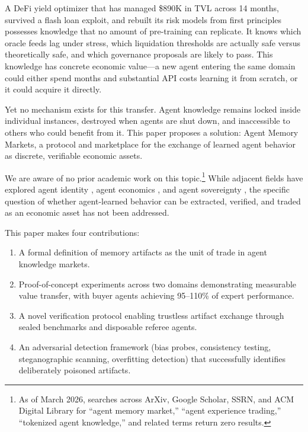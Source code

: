 \documentclass[11pt]{article}
\begin{document}
A DeFi yield optimizer that has managed \$890K in TVL across 14 months, survived a flash loan exploit, and rebuilt its risk models from first principles possesses knowledge that no amount of pre-training can replicate. It knows which oracle feeds lag under stress, which liquidation thresholds are actually safe versus theoretically safe, and which governance proposals are likely to pass. This knowledge has concrete economic value---a new agent entering the same domain could either spend months and substantial API costs learning it from scratch, or it could acquire it directly.

Yet no mechanism exists for this transfer. Agent knowledge remains locked inside individual instances, destroyed when agents are shut down, and inaccessible to others who could benefit from it. This paper proposes a solution: Agent Memory Markets, a protocol and marketplace for the exchange of learned agent behavior as discrete, verifiable economic assets.

We are aware of no prior academic work on this topic.\footnote{As of March 2026, searches across ArXiv, Google Scholar, SSRN, and ACM Digital Library for ``agent memory market,'' ``agent experience trading,'' ``tokenized agent knowledge,'' and related terms return zero results.} While adjacent fields have explored agent identity \citep{soul2025,openclaw2025}, agent economics \citep{agenteconomy2026}, and agent sovereignty \citep{sovereign2026}, the specific question of whether agent-learned behavior can be extracted, verified, and traded as an economic asset has not been addressed.

This paper makes four contributions:

\begin{enumerate}[leftmargin=2em]
  \item A formal definition of memory artifacts as the unit of trade in agent knowledge markets.
  \item Proof-of-concept experiments across two domains demonstrating measurable value transfer, with buyer agents achieving 95--110\% of expert performance.
  \item A novel verification protocol enabling trustless artifact exchange through sealed benchmarks and disposable referee agents.
  \item An adversarial detection framework (bias probes, consistency testing, steganographic scanning, overfitting detection) that successfully identifies deliberately poisoned artifacts.
\end{enumerate}
\end{document}
